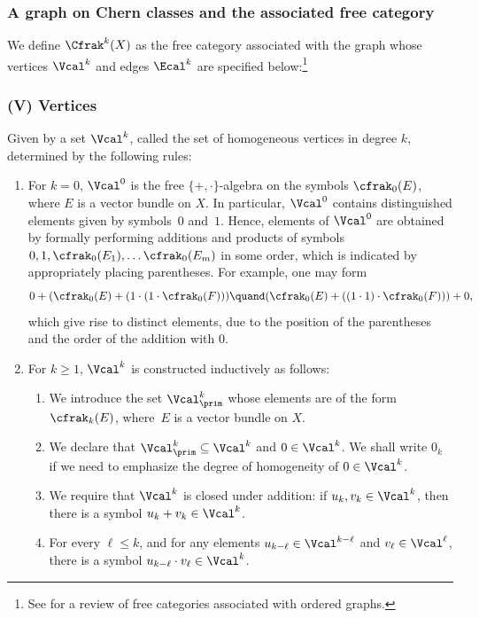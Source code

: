 \subsubsection*{A graph on Chern classes and the associated free category} We define $\Cfrak^{k}(X)$ as the free category associated with the graph whose vertices $\Vcal^{k}$ and edges $\Ecal^{k}$ are specified below:\footnote{See \cite[Chap.\,II, Section 7]{MacLane-cat} for a review of free categories associated with ordered graphs.}

\subsubsection*{\textup{(V)} Vertices}
Given by a set $\Vcal^k$, called the set of homogeneous vertices in degree $k$, determined by the following rules:
\begin{enumerate}
\item For $k=0$, $\Vcal^{0}$ is the free $\lbrace +,\cdot\rbrace$-algebra on the symbols $\cfrak_{0}(E)$, where $E$ is a vector bundle on $X$. In particular, $\Vcal^{0}$ contains distinguished elements given by symbols~$0$ and~$1$. Hence, elements of $\Vcal^{0}$ are obtained by formally performing additions and products of symbols $0, 1,\cfrak_{0}(E_{1}),\ldots\cfrak_{0}(E_{m})$ in some order, which is indicated by appropriately placing parentheses. For example, one may form
\begin{displaymath}
0+(\cfrak_{0}(E) + (1 \cdot (1 \cdot \cfrak_{0}(F))) \quand (\cfrak_{0}(E) + ((1 \cdot 1) \cdot\cfrak_{0}(F)))+0,
\end{displaymath}
which give rise to distinct elements, due to the position of the parentheses and the order of the addition with 0.

\item For $k \geq 1$, $\Vcal^k$ is constructed inductively as follows:
\begin{enumerate}
\item We introduce the set $\Vcal^k_{\prim}$ whose elements are of the form $\cfrak_{k}(E)$, where~$E$ is a vector bundle on $X$.

\item We declare that $\Vcal^k_{\prim} \subseteq \Vcal^k$ and $0 \in \Vcal^k$. We shall write $0_{k}$ if we need to emphasize the degree of homogeneity of $0 \in \Vcal^k$.

\item We require that $\Vcal^{k}$ is closed under addition: if $u_k, v_k \in \Vcal^k$, then there is a symbol $u_k + v_k \in \Vcal^k$.

\item For every $\ell\leq k$, and for any elements $u_{k-\ell} \in \Vcal^{k-\ell}$ and $ v_\ell \in \Vcal^{\ell}$, there is a symbol $u_{k-\ell} \cdot v_{\ell} \in \Vcal^{k}$.
\end{enumerate}
\end{enumerate}

